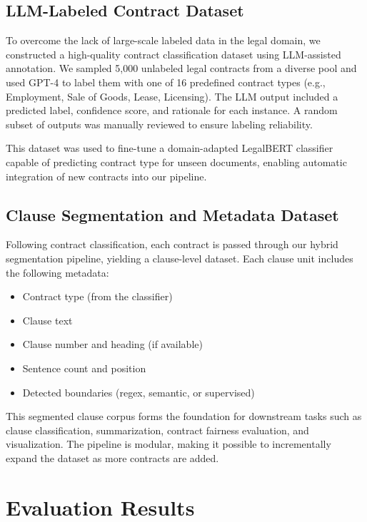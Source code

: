 \documentclass[11pt, oneside]{article}   	%
\begin{document}
\subsection*{LLM-Labeled Contract Dataset}

To overcome the lack of large-scale labeled data in the legal domain, we constructed a high-quality contract classification dataset using LLM-assisted annotation. We sampled 5,000 unlabeled legal contracts from a diverse pool and used GPT-4 to label them with one of 16 predefined contract types (e.g., Employment, Sale of Goods, Lease, Licensing). The LLM output included a predicted label, confidence score, and rationale for each instance. A random subset of outputs was manually reviewed to ensure labeling reliability.

This dataset was used to fine-tune a domain-adapted LegalBERT classifier capable of predicting contract type for unseen documents, enabling automatic integration of new contracts into our pipeline.

\subsection*{Clause Segmentation and Metadata Dataset}

Following contract classification, each contract is passed through our hybrid segmentation pipeline, yielding a clause-level dataset. Each clause unit includes the following metadata:
\begin{itemize}
    \item Contract type (from the classifier)
    \item Clause text
    \item Clause number and heading (if available)
    \item Sentence count and position
    \item Detected boundaries (regex, semantic, or supervised)

\end{itemize}

This segmented clause corpus forms the foundation for downstream tasks such as clause classification, summarization, contract fairness evaluation, and visualization. The pipeline is modular, making it possible to incrementally expand the dataset as more contracts are added.


\section*{Evaluation Results}
\end{document}
